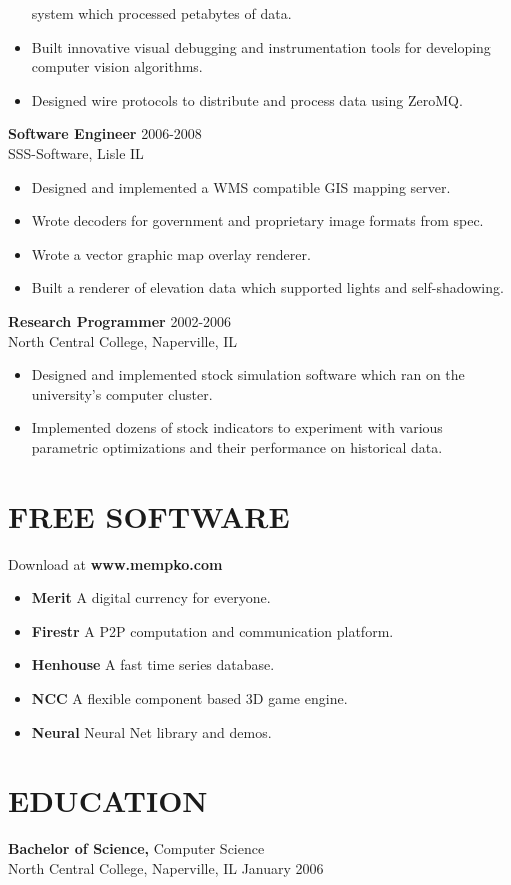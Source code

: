 \documentclass[line,margin]{res}
\begin{document}
\begin{resume}
\begin{itemize}
                        system which processed petabytes of data.
                    \item Built innovative visual debugging and instrumentation tools for developing computer vision algorithms.
                    \item Designed wire protocols to distribute and process data using ZeroMQ.
                \end{itemize}
                {\bf Software Engineer} \hfill  2006-2008 \\
                SSS-Software, Lisle IL
                 \begin{itemize}  \itemsep -1pt 
                    \item Designed and implemented a WMS compatible GIS mapping server.
                    \item Wrote decoders for government and proprietary image formats from spec.  
                    \item Wrote a vector graphic map overlay renderer.
                    \item Built a renderer of elevation data which supported lights and self-shadowing.
                 \end{itemize} 
                {\bf Research Programmer} \hfill 2002-2006 \\
                North Central College, Naperville, IL
                \begin{itemize} \itemsep -1pt 
                    \item Designed and implemented stock simulation software
                        which ran on the university's computer cluster. 
                    \item Implemented dozens of stock indicators to experiment with various
                          parametric optimizations and their performance on historical data.
                \end{itemize} 
\section{FREE SOFTWARE} Download at {\bf www.mempko.com} \\ 
                \begin{itemize} \itemsep -1pt 
                    \item {\bf Merit} A digital currency for everyone.
                    \item {\bf Firestr} A P2P computation and communication platform.
                    \item {\bf Henhouse} A fast time series database.
                    \item {\bf NCC} A flexible component based 3D game engine.
                    \item {\bf Neural} Neural Net library and demos.
                \end{itemize}

\section{EDUCATION} {\bf Bachelor of Science,} Computer Science \\
                North Central College, Naperville, IL 
                January 2006
\end{resume}
\end{document}
